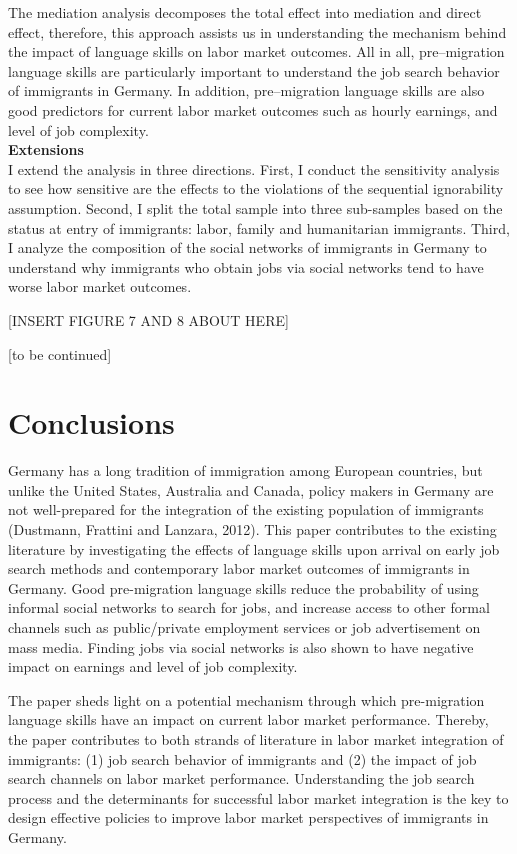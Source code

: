 \documentclass[12pt,a4paper]{article}
\begin{document}
The mediation analysis decomposes the total effect into mediation and direct effect, therefore, this approach assists us in understanding the mechanism behind the impact of language skills on labor market outcomes. All in all, pre--migration language skills are particularly important to understand the job search behavior of immigrants in Germany. In addition, pre--migration language skills are also good predictors for current labor market outcomes such as hourly earnings, and level of job complexity. \\

\textbf{Extensions}\\

I extend the analysis in three directions. First, I conduct the sensitivity analysis to see how sensitive are the effects to the violations of the sequential ignorability assumption. Second, I split the total sample into three sub-samples based on the status at entry of immigrants: labor, family and humanitarian immigrants. Third, I analyze the composition of the social networks of immigrants in Germany to understand why immigrants who obtain jobs via social networks tend to have worse labor market outcomes.

\begin{center}
[INSERT FIGURE 7 AND 8 ABOUT HERE]

[to be continued]
\end{center} 

\section{Conclusions}

Germany has a long tradition of immigration among European countries, but unlike the United States, Australia and Canada, policy makers in Germany are not well-prepared for the integration of the existing population of immigrants (Dustmann, Frattini and Lanzara, 2012). This paper contributes to the existing literature by investigating the effects of language skills upon arrival on early job search methods and contemporary labor market outcomes of immigrants in Germany. Good pre-migration language skills reduce the probability of using informal social networks to search for jobs, and increase access to other formal channels such as public/private employment services or job advertisement on mass media. Finding jobs via social networks is also shown to have negative impact on earnings and level of job complexity.

The paper sheds light on a potential mechanism through which pre-migration language skills have an impact on current labor market performance. Thereby, the paper contributes to both strands of literature in labor market integration of immigrants: (1) job search behavior of immigrants and (2) the impact of job search channels on labor market performance. Understanding the job search process and the determinants for successful labor market integration is the key to design effective policies to improve labor market perspectives of immigrants in Germany.
\end{document}
